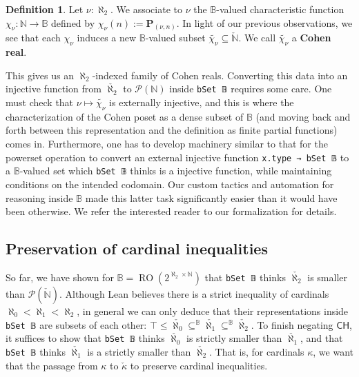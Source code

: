 \documentclass[a4paper,USenglish,cleveref, autoref]{lipics-v2019}
\newcommand{\B}{\mathbb{B}}
\newcommand{\lil}{\lstinline}
\newcommand{\N}{\mathbb{N}}
\theoremstyle{theorem}
\theoremstyle{definition}
\newtheorem{defn}[definition]{Definition}
\begin{document}
\begin{defn}
  Let $\nu : \aleph_2$. We associate to $\nu$ the $\B$-valued characteristic function $\chi_{\nu} : \N \to \B$ defined by $\chi_{\nu}(n) := \mathbf{P}_{(\nu, n)}$. In light of our previous observations, we see that each $\chi_{\nu}$ induces a new $\B$-valued subset $\widetilde{\chi_{\nu}} \subseteq \check{\N}$. We call $\widetilde{\chi_{\nu}}$ a \textbf{Cohen real}.
\end{defn}
This gives us an $\aleph_2$-indexed family of Cohen reals. Converting this data into an injective function from $\check{\aleph_2}$ to $\mathcal{P}(\mathbb{N})$ inside \lil{bSet 𝔹} requires some care. One must check that $\nu \mapsto \widetilde{\chi_{\nu}}$ is externally injective, and this is where the characterization of the Cohen poset as a dense subset of $\B$ (and moving back and forth between this representation and the definition as finite partial functions) comes in. Furthermore, one has to develop machinery similar to that for the powerset operation to convert an external injective function \lstinline{x.type → bSet 𝔹} to a $\B$-valued set which \lstinline{bSet 𝔹} thinks is a injective function, while maintaining conditions on the intended codomain. Our custom tactics and automation for reasoning inside $\B$ made this latter task significantly easier than it would have been otherwise. We refer the interested reader to our formalization for details.

\subsection{Preservation of cardinal inequalities} \label{subsect:cardinal-inequalities}
So far, we have shown for $\B = \operatorname{RO}(2^{\aleph_2 \times \mathbb{N}})$ that \lil{bSet 𝔹} thinks $\check{\aleph_2}$ is smaller than $\mathcal{P}(\check{\mathbb{N}})$. Although Lean believes there is a strict inequality of cardinals $\aleph_0 < \aleph_1 < \aleph_2$, in general we can only deduce that their representations inside \lil{bSet 𝔹} are subsets of each other: $\top \leq \check{\aleph_0} \subseteq^\B \check{\aleph_1} \subseteq^\B \check{\aleph_2}$. To finish negating $\mathsf{CH}$, it suffices to show that \lstinline{bSet 𝔹} thinks $\check{\aleph_0}$ is strictly smaller than $\check{\aleph_1}$, and that \lstinline{bSet 𝔹} thinks $\check{\aleph_1}$ is a strictly smaller than $\check{\aleph_2}$. That is, for cardinals $\kappa$, we want that the passage from $\kappa$ to $\check{\kappa}$ to preserve cardinal inequalities.
\end{document}
